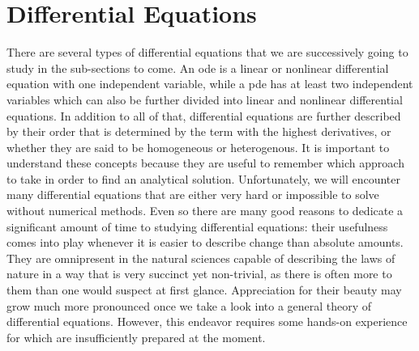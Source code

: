 \section{Differential Equations}\label{sec-diff-eq}

There are several types of differential equations that we are successively going
to study in the sub-sections to come. An \gls{ode} is a linear or nonlinear
differential equation with one independent variable, while a \gls{pde} has at least
two independent variables which can also be further divided into linear and nonlinear
differential equations. In addition to all of that, differential equations are
further described by their order that is determined by the term with the highest
derivatives, or whether they are said to be homogeneous or heterogenous. It is
important to understand these concepts because they are useful to remember which
approach to take in order to find an analytical solution. Unfortunately, we will
encounter many differential equations that are either very hard or impossible to
solve without numerical methods. Even so there are many good reasons to dedicate
a significant amount of time to studying differential equations: their usefulness
comes into play whenever it is easier to describe change than absolute amounts.
They are omnipresent in the natural sciences capable of describing the laws of
nature in a way that is very succinct yet non-trivial, as there is often more to
them than one would suspect at first glance. Appreciation for their beauty may
grow much more pronounced once we take a look into a general theory of differential
equations. However, this endeavor requires some hands-on experience for which
are insufficiently prepared at the moment.
